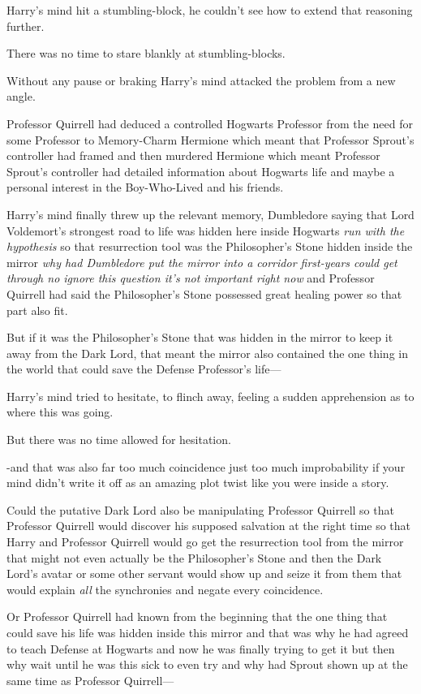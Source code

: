 Harry's mind hit a stumbling-block, he couldn't see how to extend that 
reasoning further.

There was no time to stare blankly at stumbling-blocks.

Without any pause or braking Harry's mind attacked the problem from a new angle.

Professor Quirrell had deduced a controlled Hogwarts Professor from the need 
for some Professor to Memory-Charm Hermione which meant that Professor Sprout's 
controller had framed and then murdered Hermione which meant Professor Sprout's 
controller had detailed information about Hogwarts life and maybe a personal 
interest in the Boy-Who-Lived and his friends.

Harry's mind finally threw up the relevant memory, Dumbledore saying that Lord 
Voldemort's strongest road to life was hidden here inside Hogwarts \emph{run 
with the hypothesis} so that resurrection tool was the Philosopher's Stone 
hidden inside the mirror \emph{why had Dumbledore put the mirror into a 
corridor first-years could get through no ignore this question it's not 
important right now} and Professor Quirrell had said the Philosopher's Stone 
possessed great healing power so that part also fit.

But if it was the Philosopher's Stone that was hidden in the mirror to keep it 
away from the Dark Lord, that meant the mirror also contained the one thing in 
the world that could save the Defense Professor's life---

Harry's mind tried to hesitate, to flinch away, feeling a sudden apprehension 
as to where this was going.

But there was no time allowed for hesitation.

-and that was also far too much coincidence just too much improbability if your 
mind didn't write it off as an amazing plot twist like you were inside a story.

Could the putative Dark Lord also be manipulating Professor Quirrell so that 
Professor Quirrell would discover his supposed salvation at the right time so 
that Harry and Professor Quirrell would go get the resurrection tool from the 
mirror that might not even actually be the Philosopher's Stone and then the 
Dark Lord's avatar or some other servant would show up and seize it from them 
that would explain \emph{all} the synchronies and negate every coincidence.

Or Professor Quirrell had known from the beginning that the one thing that 
could save his life was hidden inside this mirror and that was why he had 
agreed to teach Defense at Hogwarts and now he was finally trying to get it but 
then why wait until he was this sick to even try and why had Sprout shown up at 
the same time as Professor Quirrell---

